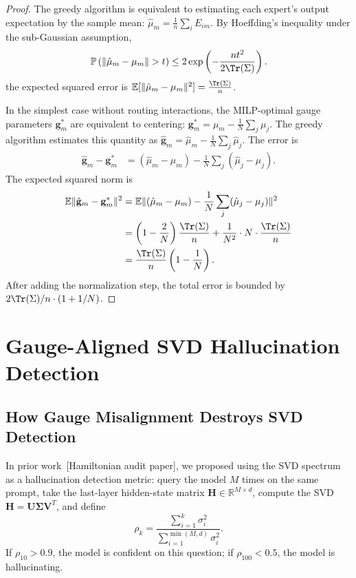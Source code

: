 \documentclass[12pt,a4paper]{article}
\theoremstyle{remark}
\newcommand{\R}{\mathbb{R}}
\newcommand{\E}{\mathbb{E}}
\newcommand{\Pbb}{\mathbb{P}}
\begin{document}
\begin{proof}
The greedy algorithm is equivalent to estimating each expert's output expectation by the sample mean: $\hat{\mu}_m = \frac{1}{n}\sum_i E_{im}$. By Hoeffding's inequality under the sub-Gaussian assumption,
\begin{equation}
    \Pbb\left(\|\hat{\mu}_m - \mu_m\| > t\right) \leq 2\exp\left(-\frac{nt^2}{2\Tr(\Sigma)}\right).
\end{equation}
the expected squared error is $\E[\|\hat{\mu}_m - \mu_m\|^2] = \frac{\Tr(\Sigma)}{n}$.

In the simplest case without routing interactions, the MILP-optimal gauge parameters $\mathbf{g}_m^*$ are equivalent to centering: $\mathbf{g}_m^* = \mu_m - \frac{1}{N}\sum_j \mu_j$. The greedy algorithm estimates this quantity as $\hat{\mathbf{g}}_m = \hat{\mu}_m - \frac{1}{N}\sum_j \hat{\mu}_j$. The error is
\begin{align}
    \hat{\mathbf{g}}_m - \mathbf{g}_m^* &= (\hat{\mu}_m - \mu_m) - \frac{1}{N}\sum_j (\hat{\mu}_j - \mu_j).
\end{align}
The expected squared norm is
\begin{align}
    \E\|\hat{\mathbf{g}}_m - \mathbf{g}_m^*\|^2 &= \E\|(\hat{\mu}_m - \mu_m) - \frac{1}{N}\sum_j (\hat{\mu}_j - \mu_j)\|^2 \\
    &= \left(1 - \frac{2}{N}\right)\frac{\Tr(\Sigma)}{n} + \frac{1}{N^2} \cdot N \cdot \frac{\Tr(\Sigma)}{n} \\
    &= \frac{\Tr(\Sigma)}{n}\left(1 - \frac{1}{N}\right).
\end{align}
After adding the normalization step, the total error is bounded by $2\Tr(\Sigma)/n \cdot (1 + 1/N)$.
\end{proof}

\section{Gauge-Aligned SVD Hallucination Detection}

\subsection{How Gauge Misalignment Destroys SVD Detection}

In prior work~[Hamiltonian audit paper], we proposed using the SVD spectrum as a hallucination detection metric: query the model $M$ times on the same prompt, take the last-layer hidden-state matrix $\mathbf{H} \in \R^{M \times d}$, compute the SVD $\mathbf{H} = \mathbf{U} \boldsymbol{\Sigma} \mathbf{V}^T$, and define
\begin{equation}
    \rho_k = \frac{\sum_{i=1}^{k} \sigma_i^2}{\sum_{i=1}^{\min(M,d)} \sigma_i^2}.
\end{equation}
If $\rho_{10} > 0.9$, the model is confident on this question; if $\rho_{100} < 0.5$, the model is hallucinating.
\end{document}
